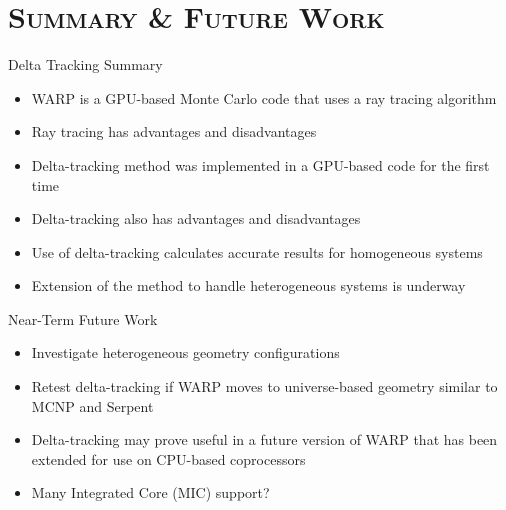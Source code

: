 \documentclass[xcolor=x11names, compress]{beamer}
\renewcommand{\(}{\begin{columns}}
\renewcommand{\)}{\end{columns}}
\newcommand{\<}[1]{\begin{column}{#1}}
\renewcommand{\>}{\end{column}}
\begin{document}
\section{\scshape Summary \& Future Work}
\begin{frame}{Delta Tracking Summary}
	\begin{itemize}
	\item{WARP is a GPU-based Monte Carlo code that uses a ray tracing algorithm}
	\item{Ray tracing has advantages and disadvantages}
	\pause\
	\vspace*{1 em}
	\item{Delta-tracking method was implemented in a GPU-based code for the first time}
	\item{Delta-tracking also has advantages and disadvantages}
	\pause
	\vspace*{1 em}
	\item{Use of delta-tracking calculates accurate results for homogeneous systems}
	\item{Extension of the method to handle heterogeneous systems is underway}
	\end{itemize}
\end{frame}


\begin{frame}{Near-Term Future Work}
	\begin{itemize}
	\item{Investigate heterogeneous geometry configurations}
	\vspace*{1 em}
	\item{Retest delta-tracking if WARP moves to universe-based geometry similar to MCNP and Serpent}
	\vspace*{1 em}
	\item{Delta-tracking may prove useful in a future version of WARP that has been extended for use 
	on CPU-based coprocessors}
	\vspace*{1 em}	
	\item Many Integrated Core (MIC) support?
	\end{itemize}
\end{frame}
\end{document}
